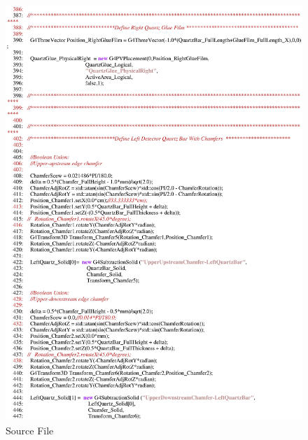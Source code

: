 \begin{figure}[ht]
  \hspace{0cm}
  \includegraphics[scale=0.8]{./figures5/QweakSimCerenkovDetector.cc-p7.eps}
  \caption{\label{SourceV7} Source File}
           \label{fig:V-SC-11}
\end{figure}
\clearpage

